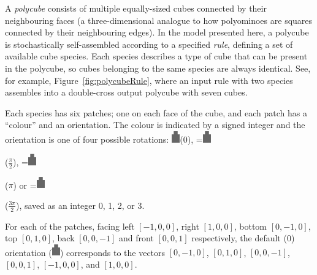 A \emph{polycube} consists of multiple equally-sized cubes connected by their neighbouring faces (a three-dimensional analogue to how polyominoes are squares connected by their neighbouring edges). In the model presented here, a polycube is stochastically self-assembled according to a specified \emph{rule}, defining a set of available cube species. Each species describes a type of cube that can be present in the polycube, so cubes belonging to the same species are always identical. See, for example, Figure~\ref{fig:polycubeRule}, where an input rule with two species assembles into a double-cross output polycube with seven cubes.

Each species has six patches; one on each face of the cube, and each patch has a ``colour'' and an orientation. The colour is indicated by a signed integer and the orientation is one of four possible rotations: \includegraphics[width=10pt]{figures/face.eps}\hspace{4pt}(\(0\)),
\begingroup{}=\hbox{\includegraphics[width=10pt,angle=-90]{figures/face.eps}}\parbox{\wd0}{}\endgroup\hspace{4pt}(\(\frac{\pi}{2}\)),
\begingroup{}=\hbox{\includegraphics[width=10pt,angle=180]{figures/face.eps}}\parbox{\wd0}{}\endgroup\hspace{4pt}(\(\pi\)) or
\begingroup{}=\hbox{\includegraphics[width=10pt,angle=90]{figures/face.eps}}\parbox{\wd0}{}\endgroup\hspace{4pt}(\(\frac{3\pi}{2}\)), saved as an integer 0, 1, 2, or 3.

For each of the patches, facing left \(\left[-1, 0, 0\right]\), right \(\left[1, 0, 0\right]\), bottom \(\left[0, -1, 0\right]\), top \(\left[0, 1, 0\right]\), back \(\left[0, 0, -1\right]\) and front \(\left[0, 0, 1\right]\) respectively, the default (\(0\)) orientation (\includegraphics[width=10pt]{figures/face.eps}) corresponds to the vectors \(\left[0, -1, 0\right]\), \(\left[0, 1, 0\right]\), \(\left[0, 0, -1\right]\), \(\left[0, 0, 1\right]\), \(\left[-1, 0, 0\right]\), and \(\left[1, 0, 0\right]\).

